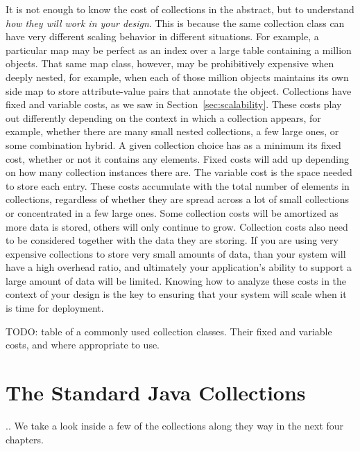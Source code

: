 It is not enough to know the cost
of collections in the abstract, but to understand \emph{how they will work in
your design}. This is because the same collection class can have very different
scaling behavior in different situations. For example, a particular map
may be perfect as an index over a large table containing a
million objects. That same map class, however, may be prohibitively expensive
when deeply nested, for example, when each of those
million objects maintains its own side map to store attribute-value pairs that
annotate the object.
Collections have fixed and variable costs, as we saw
in Section~\ref{sec:scalability}. These costs play out differently
depending on the context in which a collection appears, for example, whether
there are many small nested collections, a few large ones, or some combination
hybrid.  A given collection choice has as a minimum its fixed cost,
whether or not it contains any elements. Fixed costs will add up depending on
how many collection instances there are. The variable cost is the space needed to store each entry. These
 costs accumulate with the total number of
elements in collections, regardless of whether they are spread across a lot of
small collections or concentrated in a few large ones. 
Some collection costs will be amortized as more data is stored, others will only
continue to grow. Collection costs also need to be considered together with the data they are
storing. If you are using very expensive collections to store very small amounts
of data, than your system will have a high overhead ratio, and ultimately your application's ability
to support a large amount of data will be limited. 
Knowing how to analyze these costs in the context of your design
is the key to ensuring that your system will scale when it is time for
deployment.  

TODO: table of a commonly used collection classes. Their fixed and variable
costs, and where appropriate to use. 

\section{The Standard Java Collections}

.. We take a look inside a few of the collections along they way in the next
four chapters. 

